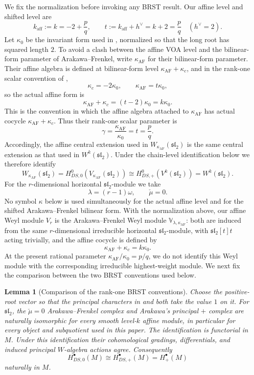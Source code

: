 \documentclass[12pt,leqno]{amsart}
\numberwithin{equation}{section}
\newtheorem{lem}[thm]{Lemma}
\begin{document}
We fix the normalization before invoking any BRST result.  Our affine
level and shifted level are
\[
 k_{\mathrm{aff}}:=k=-2+\frac pq,
 \qquad
 t:=k_{\mathrm{aff}}+h^\vee=k+2=\frac pq
 \quad(h^\vee=2).
\]
Let $\kappa_0$ be the invariant form used in
\cite[Section~3.1]{ArakawaFrenkel}, normalized so that the long root has
squared length $2$.  To avoid a clash
between the affine VOA level and the bilinear-form parameter of
Arakawa--Frenkel, write $\kappa_{\mathrm{AF}}$ for their bilinear-form parameter.
Their affine algebra is defined at bilinear-form level
$\kappa_{\mathrm{AF}}+\kappa_c$, and in the rank-one scalar convention of
\cite[Section~4.4]{ArakawaFrenkel},
\[
 \kappa_c=-2\kappa_0,\qquad
 \kappa_{\mathrm{AF}}=t\kappa_0,
\]
so the actual affine form is
\[
 \kappa_{\mathrm{AF}}+\kappa_c=(t-2)\kappa_0=k\kappa_0.
\]
This is the convention in which the affine algebra attached to
$\kappa_{\mathrm{AF}}$ has actual cocycle
$\kappa_{\mathrm{AF}}+\kappa_c$.  Thus their rank-one scalar parameter is
\[
 \gamma=\frac{\kappa_{\mathrm{AF}}}{\kappa_0}=t=\frac pq.
\]
Accordingly, the affine central extension used in
$W_{\kappa_{\mathrm{AF}}}(\mathfrak{sl}_2)$ is the same central
extension as that used in $W^k(\mathfrak{sl}_2)$.  Under the chain-level
identification below we therefore identify
\[
 W_{\kappa_{\mathrm{AF}}}(\mathfrak{sl}_2)
 =H^0_{DS,0}(V_{\kappa_{\mathrm{AF}}}(\mathfrak{sl}_2))
 \cong H^0_{DS,+}(V^k(\mathfrak{sl}_2))
 =W^k(\mathfrak{sl}_2).
\]
For the $r$-dimensional horizontal $\mathfrak{sl}_2$-module we take
\[
 \lambda=(r-1)\omega,\qquad
 \check\mu=0.
\]
No symbol $\kappa$ below is used simultaneously for the actual affine
level and for the shifted Arakawa--Frenkel bilinear form.  With the
normalization above, our affine Weyl module $V_r$ is the
Arakawa--Frenkel Weyl module
$\mathbb V_{\lambda,\kappa_{\mathrm{AF}}}$: both are induced from the
same $r$-dimensional irreducible horizontal $\mathfrak{sl}_2$-module,
with $\mathfrak{sl}_2[t]t$ acting trivially, and the affine cocycle is
defined by
\[
 \kappa_{\mathrm{AF}}+\kappa_c=k\kappa_0.
\]
At the present rational parameter $\kappa_{\mathrm{AF}}/\kappa_0=p/q$,
we do not identify this Weyl module with the corresponding irreducible
highest-weight module.
We next fix the comparison between the two BRST conventions used below.

\begin{lem}[Comparison of the rank-one BRST conventions]
\label{lem:BRST-convention-comparison}
Choose the positive-root vector so that the principal characters in
\cite{ArakawaFrenkel} and \cite{ArakawaW} both take the value $1$ on it.
For $\mathfrak{sl}_2$, the $\check\mu=0$ Arakawa--Frenkel complex and
Arakawa's principal $+$ complex are naturally isomorphic for every
smooth level-$k$ affine module, in particular for every object and
subquotient used in this paper.  The identification is functorial in $M$.  Under this identification their
cohomological gradings, differentials, and induced principal
$W$-algebra actions agree.  Consequently
\[
 H^\bullet_{DS,0}(M)\cong H^\bullet_{DS,+}(M)=H^\bullet_+(M)
\]
naturally in $M$.
\end{lem}
\end{document}
